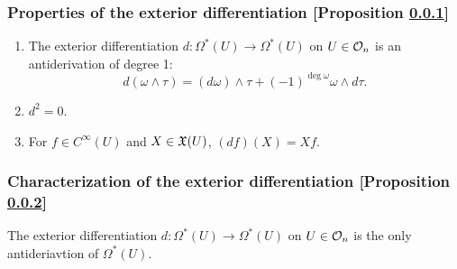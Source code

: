 \subsubsection{Properties of the exterior differentiation [Proposition \ref{properties-of-the-exterior-differentiation}]}\label{properties-of-the-exterior-differentiation}
\begin{enumerate}
\item The exterior differentiation $d \colon \Omega^*(U) \to \Omega^*(U)$ on $U \in \mathcal{O}_{n}$ is an antiderivation of degree 1:
\[
d(\omega \wedge \tau) = (d\omega)\wedge \tau + (-1)^{\deg \omega} \omega \wedge d \tau.
\]
\item $d^2 = 0$.
\item For $f \in C^\infty(U)$ and $X \in \mathfrak{X}(U)$, $(df)(X) = Xf$.
\end{enumerate}

\subsubsection{Characterization of the exterior differentiation [Proposition \ref{characterization-of-the-exterior-differentiation}]}\label{characterization-of-the-exterior-differentiation}
The exterior differentiation $d \colon \Omega^*(U) \to \Omega^*(U)$ on $U \in \mathcal{O}_{n}$ is the only antideriavtion of $\Omega^*(U)$.
